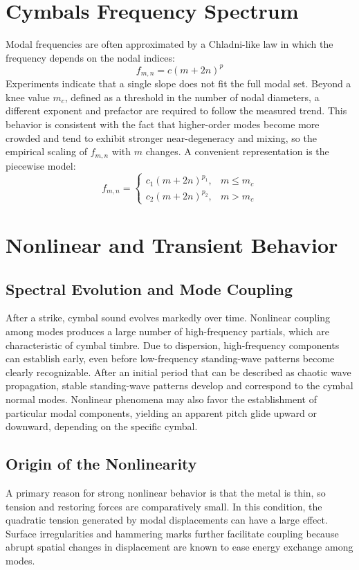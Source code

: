 \section{Cymbals Frequency Spectrum}

Modal frequencies are often approximated by a Chladni-like law in which the frequency depends on the nodal indices:
\[
f_{m,n} = c (m + 2n)^{p}
\]
Experiments indicate that a single slope does not fit the full modal set. Beyond a knee value \(m_c\), defined as a threshold in the number of nodal diameters, a different exponent and prefactor are required to follow the measured trend. This behavior is consistent with the fact that higher-order modes become more crowded and tend to exhibit stronger near-degeneracy and mixing, so the empirical scaling of \(f_{m,n}\) with \(m\) changes. A convenient representation is the piecewise model: 
\[
f_{m,n} =
\begin{cases}
c_1 (m + 2n)^{p_1}, & m \le m_c \\
c_2 (m + 2n)^{p_2}, & m > m_c
\end{cases}
\]

\section{Nonlinear and Transient Behavior}

\subsection{Spectral Evolution and Mode Coupling}

After a strike, cymbal sound evolves markedly over time. Nonlinear coupling among modes produces a large number of high-frequency partials, which are characteristic of cymbal timbre. Due to dispersion, high-frequency components can establish early, even before low-frequency standing-wave patterns become clearly recognizable. After an initial period that can be described as chaotic wave propagation, stable standing-wave patterns develop and correspond to the cymbal normal modes. Nonlinear phenomena may also favor the establishment of particular modal components, yielding an apparent pitch glide upward or downward, depending on the specific cymbal.

\subsection{Origin of the Nonlinearity}

A primary reason for strong nonlinear behavior is that the metal is thin, so tension and restoring forces are comparatively small. In this condition, the quadratic tension generated by modal displacements can have a large effect. Surface irregularities and hammering marks further facilitate coupling because abrupt spatial changes in displacement are known to ease energy exchange among modes.

